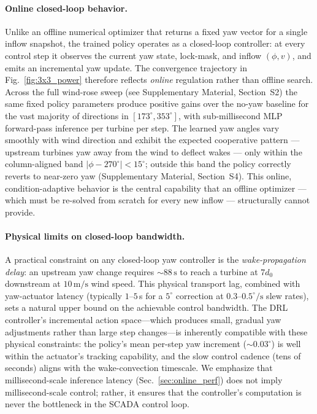 \documentclass[final,5p,times]{elsarticle}
\begin{document}




\paragraph{Online closed-loop behavior.}
Unlike an offline numerical optimizer that returns a fixed yaw vector for a single inflow snapshot, the trained policy operates as a closed-loop controller: at every control step it observes the current yaw state, lock-mask, and inflow $(\phi, v)$, and emits an incremental yaw update. The convergence trajectory in Fig.~\ref{fig:3x3_power} therefore reflects \emph{online} regulation rather than offline search. Across the full wind-rose sweep (see Supplementary Material, Section~S2) the same fixed policy parameters produce positive gains over the no-yaw baseline for the vast majority of directions in $[173^\circ,353^\circ]$, with sub-millisecond MLP forward-pass inference per turbine per step. The learned yaw angles vary smoothly with wind direction and exhibit the expected cooperative pattern --- upstream turbines yaw away from the wind to deflect wakes --- only within the column-aligned band $|\phi\!-\!270^\circ|\!<\!15^\circ$; outside this band the policy correctly reverts to near-zero yaw (Supplementary Material, Section~S4). This online, condition-adaptive behavior is the central capability that an offline optimizer --- which must be re-solved from scratch for every new inflow --- structurally cannot provide.

\paragraph{Physical limits on closed-loop bandwidth.}
A practical constraint on any closed-loop yaw controller is the \emph{wake-propagation delay}: an upstream yaw change requires ${\sim}88\,\mathrm{s}$ to reach a turbine at $7d_0$ downstream at $10\,\mathrm{m/s}$ wind speed. This physical transport lag, combined with yaw-actuator latency (typically $1$--$5$\,s for a $5^\circ$ correction at $0.3$--$0.5^\circ\!/\mathrm{s}$ slew rates), sets a natural upper bound on the achievable control bandwidth. The DRL controller's incremental action space---which produces small, gradual yaw adjustments rather than large step changes---is inherently compatible with these physical constraints: the policy's mean per-step yaw increment (${\sim}0.03^\circ$) is well within the actuator's tracking capability, and the slow control cadence (tens of seconds) aligns with the wake-convection timescale. We emphasize that millisecond-scale inference latency (Sec.~\ref{sec:online_perf}) does not imply millisecond-scale control; rather, it ensures that the controller's computation is never the bottleneck in the SCADA control loop.
\end{document}

